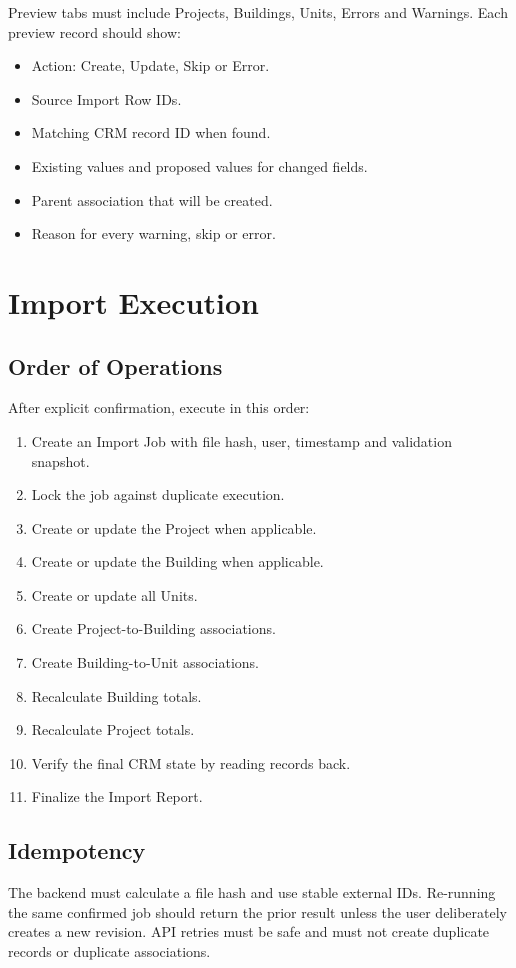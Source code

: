\documentclass[10pt]{article}
\begin{document}
Preview tabs must include Projects, Buildings, Units, Errors and Warnings. Each preview record should show:
\begin{itemize}
\item Action: Create, Update, Skip or Error.
\item Source Import Row IDs.
\item Matching CRM record ID when found.
\item Existing values and proposed values for changed fields.
\item Parent association that will be created.
\item Reason for every warning, skip or error.
\end{itemize}

\section{Import Execution}
\subsection{Order of Operations}
After explicit confirmation, execute in this order:
\begin{enumerate}
\item Create an Import Job with file hash, user, timestamp and validation snapshot.
\item Lock the job against duplicate execution.
\item Create or update the Project when applicable.
\item Create or update the Building when applicable.
\item Create or update all Units.
\item Create Project-to-Building associations.
\item Create Building-to-Unit associations.
\item Recalculate Building totals.
\item Recalculate Project totals.
\item Verify the final CRM state by reading records back.
\item Finalize the Import Report.
\end{enumerate}

\subsection{Idempotency}
The backend must calculate a file hash and use stable external IDs. Re-running the same confirmed job should return the prior result unless the user deliberately creates a new revision. API retries must be safe and must not create duplicate records or duplicate associations.
\end{document}
